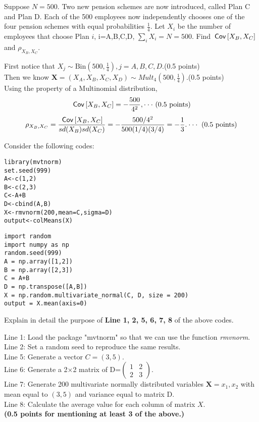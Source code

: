 \begin{exercise}[2]
Suppose $N=500.$ Two new pension schemes are now introduced, called Plan C and Plan D. Each of the 500 employees now independently chooses one of the four pension schemes with equal probabilities $\frac{1}{4}.$  Let $X_i$ be the number of employees that choose Plan $i$, i=A,B,C,D, $\sum_{i}X_i=N=500$. Find $\,\mathsf{Cov}\left[X_B,X_C\right]$ and $\rho_{X_B,X_C}.$
\begin{solution}
First notice that $X_j \sim \text{Bin}(500,\frac{1}{4}), j=A, B, C, D.$(0.5 points)\\
Then we know $\boldsymbol{X}=(X_A,X_B,X_C, X_D) \sim Mult_4(500,\frac{1}{4}).$(0.5 points)\\
Using the property of a Multinomial distribution,
\begin{align*}
    \,\mathsf{Cov}\left[X_B,X_C\right]=-\frac{500}{4^2},  \cdot \cdot \cdot \text{ (0.5 points)}
\end{align*}
\begin{align*}
       \rho_{X_B,X_C}=\frac{ \,\mathsf{Cov}\left[X_B,X_C\right]}{sd(X_B)sd(X_C)}=-\frac{500/4^2}{500(1/4)(3/4)}=-\frac{1}{3}. \cdot \cdot \cdot \text{ (0.5 points)}
\end{align*}
\end{solution}
\end{exercise}

\noindent Consider the following codes:
\begin{verbatim}
library(mvtnorm)
set.seed(999)
A<-c(1,2)
B<-c(2,3)
C<-A+B
D<-cbind(A,B)
X<-rmvnorm(200,mean=C,sigma=D)
output<-colMeans(X)
\end{verbatim}

\begin{verbatim}
import random
import numpy as np
random.seed(999)
A = np.array([1,2])
B = np.array([2,3])
C = A+B
D = np.transpose([A,B])
X = np.random.multivariate_normal(C, D, size = 200)
output = X.mean(axis=0)
\end{verbatim}


\begin{exercise}[1]
Explain in detail the purpose of \textbf{Line 1, 2, 5, 6, 7, 8} of the above codes.
\begin{solution}
Line 1: Load the package "mvtnorm" so that we can use the function \textit{rmvnorm}.\\
Line 2: Set a random seed to reproduce the same results.\\
Line 5: Generate a vector $C=(3,5)$.\\
Line 6: Generate a 2$\times$2 matrix of D=$\begin{pmatrix}1&2\\2&3\end{pmatrix}$.\\
Line 7: Generate 200 multivariate normally distributed variables $\textbf{X}={x_1,x_2}$ with mean equal to $(3,5)$ and variance equal to matrix D.\\
Line 8: Calculate the average value for each column of matrix $X$.\\
\textbf{(0.5 points for mentioning at least 3 of the above.)}
\end{solution}
\end{exercise}
